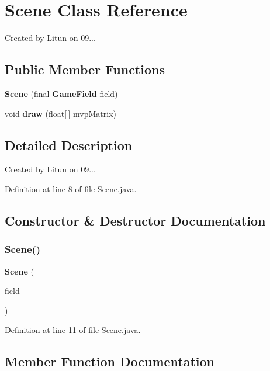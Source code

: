 \section{Scene Class Reference}
\label{classru_1_1litun_1_1unitingtwist_1_1_scene}


Created by Litun on 09...  


\subsection*{Public Member Functions}
\begin{DoxyCompactItemize}
\item 
\textbf{ Scene} (final \textbf{ Game\+Field} field)
\item 
void \textbf{ draw} (float[$\,$] mvp\+Matrix)
\end{DoxyCompactItemize}


\subsection{Detailed Description}
Created by Litun on 09... 

Definition at line 8 of file Scene.\+java.



\subsection{Constructor \& Destructor Documentation}
\mbox{\label{classru_1_1litun_1_1unitingtwist_1_1_scene_ace890167c04c77a3bc42f2f095611528}} 
\subsubsection{Scene()}
{\footnotesize\ttfamily \textbf{ Scene} (\begin{DoxyParamCaption}\item[{final \textbf{ Game\+Field}}]{field }\end{DoxyParamCaption})}



Definition at line 11 of file Scene.\+java.



\subsection{Member Function Documentation}
\mbox{\label{classru_1_1litun_1_1unitingtwist_1_1_scene_ace8a0d2a4e41b6d83897d48fd91a7ab3}} 
